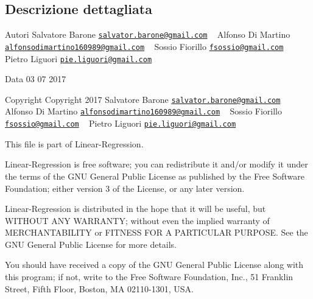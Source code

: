 \subsection{Descrizione dettagliata}
\begin{DoxyAuthor}{Autori}
Salvatore Barone \href{mailto:salvator.barone@gmail.com}{\tt salvator.\+barone@gmail.\+com} ~\newline
 Alfonso Di Martino \href{mailto:alfonsodimartino160989@gmail.com}{\tt alfonsodimartino160989@gmail.\+com} ~\newline
 Sossio Fiorillo \href{mailto:fsossio@gmail.com}{\tt fsossio@gmail.\+com} ~\newline
 Pietro Liguori \href{mailto:pie.liguori@gmail.com}{\tt pie.\+liguori@gmail.\+com} ~\newline

\end{DoxyAuthor}
\begin{DoxyDate}{Data}
03 07 2017
\end{DoxyDate}
\begin{DoxyCopyright}{Copyright}
Copyright 2017 Salvatore Barone \href{mailto:salvator.barone@gmail.com}{\tt salvator.\+barone@gmail.\+com} ~\newline
 Alfonso Di Martino \href{mailto:alfonsodimartino160989@gmail.com}{\tt alfonsodimartino160989@gmail.\+com} ~\newline
 Sossio Fiorillo \href{mailto:fsossio@gmail.com}{\tt fsossio@gmail.\+com} ~\newline
 Pietro Liguori \href{mailto:pie.liguori@gmail.com}{\tt pie.\+liguori@gmail.\+com} ~\newline

\end{DoxyCopyright}
This file is part of Linear-\/\+Regression.

Linear-\/\+Regression is free software; you can redistribute it and/or modify it under the terms of the G\+NU General Public License as published by the Free Software Foundation; either version 3 of the License, or any later version.

Linear-\/\+Regression is distributed in the hope that it will be useful, but W\+I\+T\+H\+O\+UT A\+NY W\+A\+R\+R\+A\+N\+TY; without even the implied warranty of M\+E\+R\+C\+H\+A\+N\+T\+A\+B\+I\+L\+I\+TY or F\+I\+T\+N\+E\+SS F\+OR A P\+A\+R\+T\+I\+C\+U\+L\+AR P\+U\+R\+P\+O\+SE. See the G\+NU General Public License for more details.

You should have received a copy of the G\+NU General Public License along with this program; if not, write to the Free Software Foundation, Inc., 51 Franklin Street, Fifth Floor, Boston, MA 02110-\/1301, U\+SA. 
